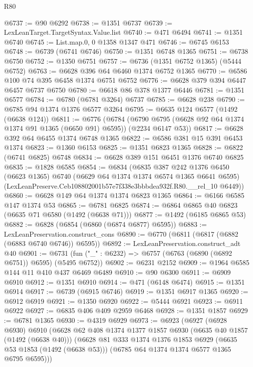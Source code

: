 \begin{lexlean}{R80}
\begin{coremodule}
@6737 := @90 @6292
@6738 := @1351 @6737
@6739 := LexLeanTarget.TargetSyntax.Value.list
@6740 := @471 @6494
@6741 := @1351 @6740
@6745 := List.map.{0, 0} @1358 @1347 @471
@6746 := @6745 @6153
@6748 := @6739 (@6741 @6746)
@6750 := @1351 @6748 @1365
@6751 := @6738 @6750
@6752 := @1350 @6751
@6757 := @6736 (@1351 @6752 @1365) (@5444 @6752)
@6763 := @6628 @396 @64 @6460 @1374 @6752 @1365
@6770 := @6586 @100 @74 @395 @6458 @1374 @6751 @6752
@6776 := @6628 @379 @394 @6447 @6457 @6737 @6750
@6780 := @6618 @86 @378 @1377 @6446
@6781 := @1351 @6577
@6784 := @6780 (@6781 @3264) @6737
@6785 := @6628 @238
@6790 := @6785 @94 @1374 @1376 @6577 @3264
@6795 := @6635 @124 @6577 (@1492 (@6638 @124))
@6811 := @6776
    (@6784 (@6790 @6795 (@6628 @92 @64 @1374 @1374 @91 @1365 (@6650 @91) @6595)) (@2234 @6147 @53))
@6817 := @6628 @392 @64 @6455 @1374 @6748 @1365
@6822 := @6586 @381 @15 @391 @6453 @1374
@6823 := @1360 @6153
@6825 := @1351 @6823 @1365
@6828 := @6822 (@6741 @6825) @6748
@6834 := @6628 @389 @151 @6451 @1376 @6740 @6825
@6835 := @1828 @6585
@6854 := @6834
    (@6835
      @387
      @242
      @1376
      @6450
      (@6623 @1365)
      @6740
      (@6629 @64 @1374 @1374 @6574 @1365 @6641 @6595)
      (LexLeanPreserve.Ceb108802001b57e7f338e3bbbdea932f.R80.__rel_10 @6449))
@6860 := @6628 @149 @64 @1374 @1374 @6823 @1365
@6864 := @6166 @6585 @147 @1374 @53
@6865 := @6781 @6825
@6874 := @6864 @6865 @40 @6823 (@6635 @71 @6580 (@1492 (@6638 @71)))
@6877 := @1492 (@6185 @6865 @53)
@6882 := @6828 (@6854 (@6860 (@6874 @6877) @6595))
@6883 := LexLeanPreservation.construct_cons
@6890 := @6770 (@6811 (@6817 (@6882 (@6883 @6740 @6746)) @6595))
@6892 := LexLeanPreservation.construct_adt @40
@6901 := @6731 (fun ("_" : @6232) => @6757 (@6763 (@6890 (@6892 @6751)) @6595) (@5495 @6752))
@6902 := @6231 @2152
@6909 := @1964 @6585 @144 @11 @410 @437 @6469 @6489
@6910 := @90 @6300
@6911 := @6909 @6910
@6912 := @1351 @6910
@6914 := @471 (@6148 @6474)
@6915 := @1351 @6914
@6917 := @6739 (@6915 @6746)
@6919 := @1351 @6917 @1365
@6920 := @6912 @6919
@6921 := @1350 @6920
@6922 := @5444 @6921
@6923 := @6911 @6922
@6927 := @6835 @406 @409 @2959 @6468
@6928 := @1351 @1857
@6929 := @6781 @1365
@6930 := @4319 @6929
@6973 := @6923
    (@6927
      (@6928 @6930)
      @6910
      (@6628
        @62
        @408
        @1374
        @1377
        @1857
        @6930
        (@6635 @40 @1857 (@1492 (@6638 @40)))
        (@6628
          @81
          @333
          @1374
          @1376
          @1853
          @6929
          (@6635 @53 @1853 (@1492 (@6638 @53)))
          (@6785 @64 @1374 @1374 @6577 @1365 @6795 @6595)))

\end{coremodule}
\end{lexlean}
